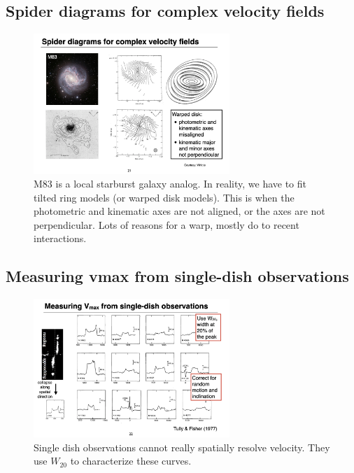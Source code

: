 \documentclass{article}
\begin{document}
\subsection{Spider diagrams for complex velocity fields}

\begin{figure}
    \centering
    \includegraphics[width=0.66\textwidth]{figs/Screen Shot 2021-10-22 at 10.23.01 AM.png}
    \caption{M83 is a local starburst galaxy analog. In reality, we have to fit tilted ring models (or warped disk models). This is when the photometric and kinematic axes are not aligned, or the axes are not perpendicular. Lots of reasons for a warp, mostly do to recent interactions. }
    \label{fig:warps}
\end{figure}

\subsection{Measuring vmax from single-dish observations}

\begin{figure}
    \centering
    \includegraphics[width=0.66\textwidth]{figs/Screen Shot 2021-10-22 at 10.26.13 AM.png}
    \caption{Single dish observations cannot really spatially resolve velocity. They use $W_{20}$ to characterize these curves. }
    \label{fig:single_dish_stuff}
\end{figure}
\end{document}
